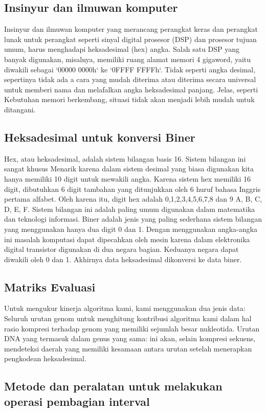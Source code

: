 \subsection{Insinyur dan ilmuwan komputer}
Insinyur dan ilmuwan komputer yang merancang perangkat keras dan perangkat lunak untuk perangkat seperti sinyal digital
prosesor (DSP) dan prosesor tujuan umum, harus menghadapi heksadesimal (hex)
angka. Salah satu DSP yang banyak digunakan, misalnya, memiliki ruang alamat memori 4 gigaword, yaitu
diwakili sebagai `00000 0000h` ke `0FFFF FFFFh`. Tidak seperti angka desimal, sepertinya tidak ada a
cara yang mudah diterima atau diterima secara universal untuk memberi nama dan melafalkan angka heksadesimal panjang. Jelas, seperti
Kebutuhan memori berkembang, situasi tidak akan menjadi lebih mudah untuk ditangani.

\subsection{Heksadesimal untuk konversi Biner}
Hex, atau heksadesimal, adalah sistem bilangan basis 16. Sistem bilangan ini sangat khusus
Menarik karena dalam sistem desimal yang biasa digunakan kita hanya memiliki 10 digit untuk mewakili angka.
Karena sistem hex memiliki 16 digit, dibutuhkan 6 digit tambahan yang ditunjukkan oleh 6 huruf bahasa Inggris pertama
alfabet. Oleh karena itu, digit hex adalah 0,1,2,3,4,5,6,7,8 dan 9 A, B, C, D, E, F. Sistem bilangan ini adalah
paling umum digunakan dalam matematika dan teknologi informasi. Biner adalah jenis yang paling sederhana
sistem bilangan yang menggunakan hanya dua digit 0 dan 1. Dengan menggunakan angka-angka ini masalah komputasi
dapat dipecahkan oleh mesin karena dalam elektronika digital transistor digunakan di dua negara bagian. Keduanya
negara dapat diwakili oleh 0 dan 1. Akhirnya data heksadesimal dikonversi ke data biner.

\subsection{Matriks Evaluasi}
Untuk mengukur kinerja algoritma kami, kami menggunakan dua jenis data:
 Seluruh urutan genom untuk menghitung kontribusi algoritma kami dalam hal rasio kompresi terhadap genom yang memiliki sejumlah besar nukleotida.
 Urutan DNA yang termasuk dalam genus yang sama: ini akan, selain kompresi sekuens, mendeteksi daerah yang memiliki kesamaan antara urutan setelah menerapkan pengkodean heksadesimal.

\subsection{Metode dan peralatan untuk melakukan operasi pembagian interval}

